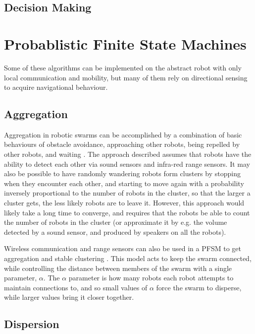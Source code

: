 \documentclass[]{article}
\begin{document}
\subsection{Decision Making}

\section{Probablistic Finite State Machines}

Some of these algorithms can be implemented on the abstract robot with only local communication and mobility, but many of them rely on directional sensing to acquire navigational behaviour. 

\subsection{Aggregation}

Aggregation in robotic swarms can be accomplished by a combination of basic behaviours of obstacle avoidance, approaching other robots, being repelled by other robots, and waiting \cite{soysal2005probabilistic}.
The approach described assumes that robots have the ability to detect each other via sound sensors and infra-red range sensors. 
It may also be possible to have randomly wandering robots form clusters by stopping when they encounter each other, and starting to move again with a probability inversely proportional to the number of robots in the cluster, so that the larger a cluster gets, the less likely robots are to leave it. 
However, this approach would likely take a long time to converge, and requires that the robots be able to count the number of robots in the cluster (or approximate it by e.g. the volume detected by a sound sensor, and produced by speakers on all the robots).

Wireless communication and range sensors can also be used in a PFSM to get aggregation and stable clustering \cite{winfield2008modelling}.
This model acts to keep the swarm connected, while controlling the distance between members of the swarm with a single parameter, $\alpha$.
The $\alpha$ parameter is how many robots each robot attempts to maintain connections to, and so small values of $\alpha$ force the swarm to disperse, while larger values bring it closer together. 

\subsection{Dispersion}
\end{document}
